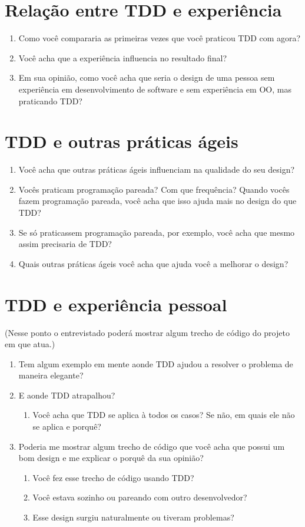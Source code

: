 \section{Relação entre TDD e experiência}

\begin{enumerate}
	\item Como você compararia as primeiras vezes que você praticou TDD com agora?
	\item Você acha que a experiência influencia no resultado final?
	\item Em sua opinião, como você acha que seria o design de uma pessoa sem experiência em desenvolvimento de software e sem experiência em OO, mas praticando TDD?
\end{enumerate}

\section{TDD e outras práticas ágeis}

\begin{enumerate}
	\item Você acha que outras práticas ágeis influenciam na qualidade do seu design?
	\item Vocês praticam programação pareada? Com que frequência? Quando vocês fazem programação pareada, você acha que isso ajuda mais no design do que TDD?
	\item Se só praticassem programação pareada, por exemplo, você acha que mesmo assim precisaria de TDD?
	\item Quais outras práticas ágeis você acha que ajuda você a melhorar o design?
\end{enumerate}

\section{TDD e experiência pessoal}

(Nesse ponto o entrevistado poderá mostrar algum trecho de código do projeto em que atua.)

\begin{enumerate}
	\item Tem algum exemplo em mente aonde TDD ajudou a resolver o problema de maneira elegante?
	\item E aonde TDD atrapalhou?
		\begin{enumerate}
			\item Você acha que TDD se aplica à todos os casos? Se não, em quais ele não se aplica e porquê?
		\end{enumerate}
	\item Poderia me mostrar algum trecho de código que você acha que possui um bom design e me explicar o porquê da sua opinião?
		\begin{enumerate}
			\item Você fez esse trecho de código usando TDD?
			\item Você estava sozinho ou pareando com outro desenvolvedor?
			\item Esse design surgiu naturalmente ou tiveram problemas?
		\end{enumerate}
\end{enumerate}


